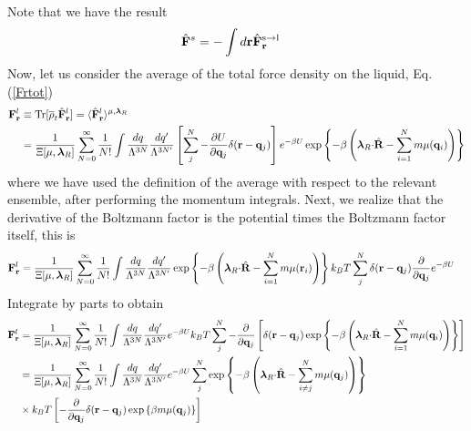 \documentclass[b5paper,openright,11pt]{book}
\begin{document}
\begin{appendices}
Note that we have the result
\begin{align}
    \hat{\bf F}^s&= -\int d{\bf r}\hat{\bf F}^{\rm s\to l}_{\bf r}
\end{align}
Now, let us consider the average of the total force density on the liquid, Eq. (\ref{Frtot})
\begin{align}
{\bf F}^l_{\bf r} &\equiv{\rm Tr}[\overline{\rho}_t \hat{\bf F}^l_{\bf r}] =
 \langle \hat{\bf F}^l_{\bf r}\rangle^{\mu,\boldsymbol{\lambda}_R}
\nonumber\\
&=
\frac{1}{\Xi[\mu,\boldsymbol{\lambda}_R]}
 \sum_{N=0}^\infty \frac{1}{N!}
\int \frac{dq}{\Lambda^{3N}}\frac{dq'}{\Lambda^{3N'}}
\left[\sum^{N}_{j}-\frac{\partial U}{\partial {\bf q}_{j}}\delta({\bf r}-{\bf q}_j)\right]
e^{-\beta U}
\exp\left\{-\beta  \left( \boldsymbol{\lambda}_R{\cdot}\hat{\bf R}
-\sum_{i=1}^N m\mu({\bf q}_i)\right)\right\}
\end{align}
where we have  used the definition of the average  with respect to the
relevant ensemble,  after performing the momentum  integrals. Next, we
realize that the  derivative of the Boltzmann factor  is the potential
times the Boltzmann factor itself, this is
\begin{align}
{\bf F}^l_{\bf r}&=
\frac{1}{\Xi[\mu,\boldsymbol{\lambda}_R]}
 \sum_{N=0}^\infty \frac{1}{N!}
\int \frac{dq}{\Lambda^{3N}}\frac{dq'}{\Lambda^{3N'}}
\exp\left\{-\beta  \left(\boldsymbol{\lambda}_R{\cdot}\hat{\bf R}
-\sum_{i=1}^N m\mu({\bf   r}_i)\right)\right\}
k_BT\sum^{N}_{j}\delta({\bf r}-{\bf q}_j)\frac{\partial }{\partial {\bf q}_{j}}e^{-\beta U}
\end{align}
Integrate by parts to obtain
\begin{align}
{\bf F}^l_{\bf r}&=
\frac{1}{\Xi[\mu,\boldsymbol{\lambda}_R]}
 \sum_{N=0}^\infty \frac{1}{N!}
\int \frac{dq}{\Lambda^{3N}}\frac{dq'}{\Lambda^{3N'}}
e^{-\beta U}
k_BT\sum^{N}_{j}-\frac{\partial }{\partial {\bf q}_{j}}\left[\delta({\bf r}-{\bf q}_j)
\exp\left\{-\beta  \left( \boldsymbol{\lambda}_R{\cdot}\hat{\bf R}
-\sum_{i=1}^N m\mu({\bf q}_i)\right)\right\}\right]
\nonumber\\
&=
\frac{1}{\Xi[\mu,\boldsymbol{\lambda}_R]}
 \sum_{N=0}^\infty \frac{1}{N!}
\int \frac{dq}{\Lambda^{3N}}\frac{dq'}{\Lambda^{3N'}}
e^{-\beta U}
\sum^{N}_{j}\exp\left\{-\beta  \left( \boldsymbol{\lambda}_R{\cdot}\hat{\bf R}
-\sum_{i\neq j}^N m\mu({\bf   q}_j)\right)\right\}
\nonumber\\
&\times k_BT\left[-\frac{\partial }{\partial {\bf q}_{j}}\delta({\bf r}-{\bf q}_j)
\exp\left\{\beta   m\mu({\bf   q}_j)\right\}\right]

\end{align}
\end{appendices}
\end{document}
